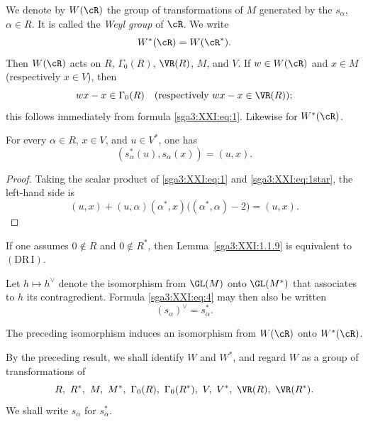 \begin{definition}\label{sga3:XXI:1.1.8}
We denote by \(W(\cR)\) the group of transformations of \(M\) generated
by the \(s_\alpha\), \(\alpha\in R\). It is called the \emph{Weyl
group} of \(\cR\). We write
\[
 W^\ast(\cR)=W(\cR^\ast).
\]
Then \(W(\cR)\) acts on \(R\), \(\Gamma_0(R)\), \(\VR(R)\), \(M\),
and \(V\). If \(w\in W(\cR)\) and \(x\in M\) (respectively
\(x\in V\)), then
\[
 wx-x\in\Gamma_0(R)
 \quad\text{(respectively }wx-x\in\VR(R)\text{)};
\]
this follows immediately from formula \eqref{sga3:XXI:eq:1}.
Likewise for \(W^\ast(\cR)\).
\end{definition}

\begin{lemma}\label{sga3:XXI:1.1.9}
For every \(\alpha\in R\), \(x\in V\), and \(u\in V^\ast\), one has
\begin{equation}
 (s_\alpha^\ast(u),s_\alpha(x))=(u,x).
 \tag{4}\label{sga3:XXI:eq:4}
\end{equation}
\end{lemma}

\begin{proof}
Taking the scalar product of \eqref{sga3:XXI:eq:1} and
\eqref{sga3:XXI:eq:1star}, the left-hand side is
\[
 (u,x)+(u,\alpha)(\alpha^\ast,x)
       \bigl((\alpha^\ast,\alpha)-2\bigr)=(u,x).
\]
\end{proof}

\begin{remark}\label{sga3:XXI:1.1.10}
If one assumes \(0\notin R\) and \(0\notin R^\ast\), then
Lemma~\ref{sga3:XXI:1.1.9} is equivalent to
\((\mathrm{DR\,I})\).
\end{remark}

\begin{corollary}\label{sga3:XXI:1.1.11}
Let \(h\mapsto h^\vee\) denote the isomorphism from
\(\GL(M)\) onto \(\GL(M^\ast)\) that associates to \(h\) its
contragredient. Formula \eqref{sga3:XXI:eq:4} may then also be written
\begin{equation}
 (s_\alpha)^\vee=s_\alpha^\ast.
 \tag{5}\label{sga3:XXI:eq:5}
\end{equation}
\end{corollary}

\begin{corollary}\label{sga3:XXI:1.1.12}
The preceding isomorphism induces an isomorphism from \(W(\cR)\) onto
\(W^\ast(\cR)\).
\end{corollary}

\begin{scholium}\label{sga3:XXI:1.1.13}
By the preceding result, we shall identify \(W\) and \(W^\ast\), and
regard \(W\) as a group of transformations of
\[
 R,\ R^\ast,\ M,\ M^\ast,\ \Gamma_0(R),\ \Gamma_0(R^\ast),\
 V,\ V^\ast,\ \VR(R),\ \VR(R^\ast).
\]
We shall write \(s_\alpha\) for \(s_\alpha^\ast\).
\end{scholium}

